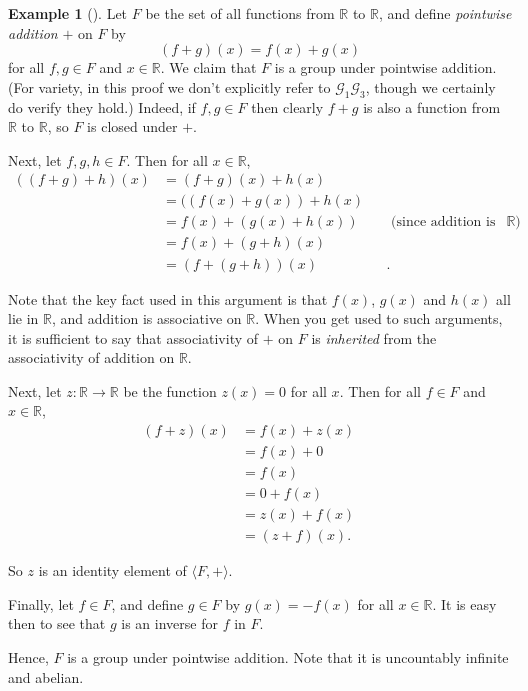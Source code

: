 \documentclass[10pt,openany,oneside]{book}
\theoremstyle{plain}
\theoremstyle{definition}
\theoremstyle{definition}
\theoremstyle{definition}
\newtheorem{example}[theorem]{Example}
\theoremstyle{definition}
\numberwithin{equation}{section}
\def\R{\mathbb{R}}
\def\G{\mathcal{G}}
\newcommand{\amp}{&}
\begin{document}
\begin{example}[]\label{funcrr}
\label{notation-44}
 Let \(F\) be the set of all functions from \(\R\) to \(\R\), and define \emph{pointwise addition} \(+\) on \(F\) by%
\begin{equation*}
(f+g)(x)=f(x)+g(x)
\end{equation*}
for all \(f,g\in F\) and \(x\in \R\). We claim that \(F\) is a group under pointwise addition. (For variety, in this proof we don't explicitly refer to \(\G_1\)\textendash{}\(\G_3\), though we certainly do verify they hold.) Indeed, if \(f,g\in F\) then clearly \(f+g\) is also a function from \(\R\) to \(\R\), so \(F\) is closed under \(+\).%
\par
Next, let \(f,g,h\in F\). Then for all \(x\in \R\),%
\begin{align*}
((f+g)+h)(x)\amp =(f+g)(x)+h(x)\amp \amp\\
\amp =((f(x)+g(x))+h(x)\amp \amp\\
\amp =f(x)+(g(x)+h(x))\amp \amp \text{ (since addition is associative on
\(\R\)) }\\
\amp =f(x)+(g+h)(x)\amp \amp\\
\amp =(f+(g+h))(x)\amp \amp .
\end{align*}
%
\par
Note that the key fact used in this argument is that \(f(x)\), \(g(x)\) and \(h(x)\) all lie in \(\R\), and addition is associative on \(\R\). When you get used to such arguments, it is sufficient to say that associativity of \(+\) on \(F\) is \emph{inherited} from the associativity of addition on \(\R\).%
\par
Next, let \(z:\R\to\R\) be the function \(z(x)=0\) for all \(x\). Then for all \(f\in F\) and \(x\in \R\),%
\begin{align*}
(f+z)(x)\amp =f(x)+z(x)\amp \amp\\
\amp =f(x)+0\amp \amp\\
\amp =f(x)\amp \amp \\
\amp =0+f(x)\amp \amp\\
\amp =z(x)+f(x)\amp \amp\\
\amp = (z+f)(x).
\end{align*}
%
\par
So \(z\) is an identity element of \(\langle F,+\rangle\).%
\par
Finally, let \(f\in F\), and define \(g\in F\) by \(g(x)=-f(x)\) for all \(x\in \R\). It is easy then to see that \(g\) is an inverse for \(f\) in \(F\).%
\par
Hence, \(F\) is a group under pointwise addition. Note that it is uncountably infinite and abelian.%
\end{example}
\end{document}
